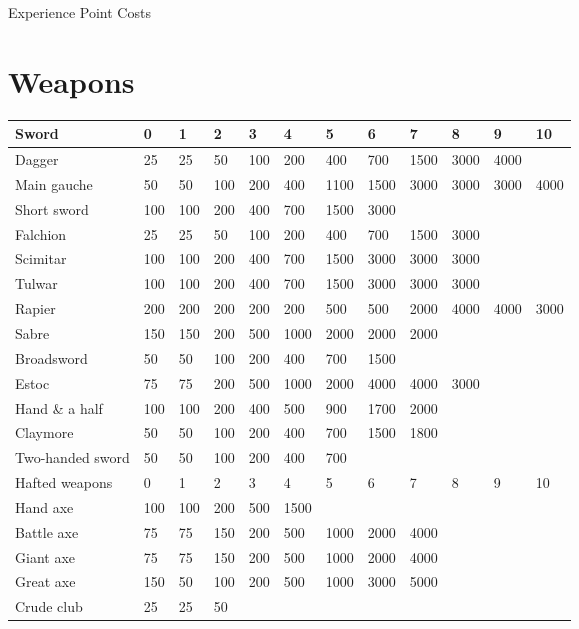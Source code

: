 \begin{Tables}{Experience Point Costs}

\section{Weapons}

\begin{tabularx}{\linewidth}{Xlllllllllll} \hline
Sword			& 0	& 1	& 2	& 3	& 4	& 5	& 6	& 7	& 8	& 9	& 10	\\ \hline
Dagger			& 25	& 25	& 50	& 100	& 200	& 400	& 700	& 1500	& 3000	& 4000	& 	\\
Main gauche		& 50	& 50 	& 100	& 200	& 400	& 1100	& 1500	& 3000	& 3000	& 3000	& 4000	\\
Short sword		& 100	& 100 	& 200	& 400	& 700	& 1500	& 3000	& 	& 	& 	&  \\
Falchion		& 25	& 25 	& 50	& 100	& 200	& 400	& 700	& 1500	& 3000	& 	&  \\
Scimitar		& 100	& 100 	& 200	& 400	& 700	& 1500	& 3000	& 3000	& 3000	& 	&  \\
Tulwar			& 100	& 100 	& 200	& 400	& 700	& 1500	& 3000	& 3000	& 3000	& 	&  \\
Rapier			& 200	& 200 	& 200	& 200	& 200	& 500	& 500	& 2000	& 4000	& 4000	& 3000 \\
Sabre			& 150	& 150 	& 200	& 500	& 1000	& 2000	& 2000	& 2000	& 	& 	&  \\
Broadsword		& 50	& 50 	& 100	& 200	& 400	& 700	& 1500	& 	& 	& 	&  \\
Estoc			& 75	& 75 	& 200	& 500	& 1000	& 2000	& 4000	& 4000	& 3000	& 	&  \\
Hand \& a half		& 100	& 100 	& 200	& 400	& 500	& 900	& 1700	& 2000	& 	& 	&  \\
Claymore		& 50	& 50 	& 100	& 200	& 400	& 700	& 1500	& 1800	& 	& 	&  \\
Two-handed sword	& 50	& 50 	& 100	& 200	& 400	& 700	& 	& 	& 	& 	&  \\ \hline
Hafted weapons		& 0	& 1 	& 2	& 3	& 4	& 5	& 6	& 7	& 8	& 9	& 10 \\ \hline
Hand axe		& 100	& 100 	& 200	& 500	& 1500	& 	& 	& 	& 	& 	&  \\
Battle axe		& 75	& 75 	& 150	& 200	& 500	& 1000	& 2000	& 4000	& 	& 	&  \\
Giant axe		& 75	& 75 	& 150	& 200	& 500	& 1000	& 2000	& 4000	& 	& 	&  \\
Great axe		& 150	& 50 	& 100	& 200	& 500	& 1000	& 3000	& 5000	& 	& 	&  \\
Crude club		& 25	& 25 	& 50	& 	& 	& 	& 	& 	& 	& 	&  \\

\end{tabularx}
\end{Tables}
